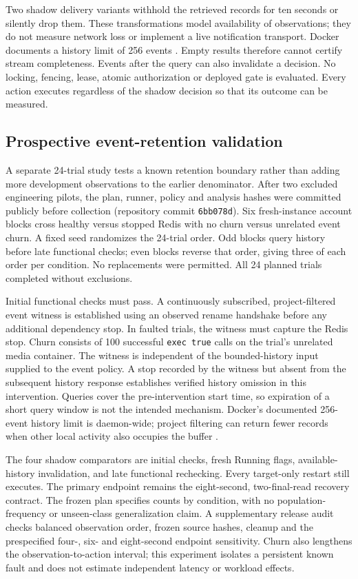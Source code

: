\documentclass[manuscript,review,nonacm]{acmart}
\begin{document}
Two shadow delivery variants withhold the retrieved records for ten seconds or silently drop them. These transformations model availability of observations; they do not measure network loss or implement a live notification transport. Docker documents a history limit of 256 events \cite{docker}. Empty results therefore cannot certify stream completeness. Events after the query can also invalidate a decision. No locking, fencing, lease, atomic authorization or deployed gate is evaluated. Every action executes regardless of the shadow decision so that its outcome can be measured.

\subsection{Prospective event-retention validation}
A separate 24-trial study tests a known retention boundary rather than adding more development observations to the earlier denominator. After two excluded engineering pilots, the plan, runner, policy and analysis hashes were committed publicly before collection (repository commit \texttt{6bb078d}). Six fresh-instance account blocks cross healthy versus stopped Redis with no churn versus unrelated event churn. A fixed seed randomizes the 24-trial order. Odd blocks query history before late functional checks; even blocks reverse that order, giving three of each order per condition. No replacements were permitted. All 24 planned trials completed without exclusions.

Initial functional checks must pass. A continuously subscribed, project-filtered event witness is established using an observed rename handshake before any additional dependency stop. In faulted trials, the witness must capture the Redis stop. Churn consists of 100 successful \texttt{exec true} calls on the trial's unrelated media container. The witness is independent of the bounded-history input supplied to the event policy. A stop recorded by the witness but absent from the subsequent history response establishes verified history omission in this intervention. Queries cover the pre-intervention start time, so expiration of a short query window is not the intended mechanism. Docker's documented 256-event history limit is daemon-wide; project filtering can return fewer records when other local activity also occupies the buffer \cite{docker}.

The four shadow comparators are initial checks, fresh Running flags, available-history invalidation, and late functional rechecking. Every target-only restart still executes. The primary endpoint remains the eight-second, two-final-read recovery contract. The frozen plan specifies counts by condition, with no population-frequency or unseen-class generalization claim. A supplementary release audit checks balanced observation order, frozen source hashes, cleanup and the prespecified four-, six- and eight-second endpoint sensitivity. Churn also lengthens the observation-to-action interval; this experiment isolates a persistent known fault and does not estimate independent latency or workload effects.
\end{document}
